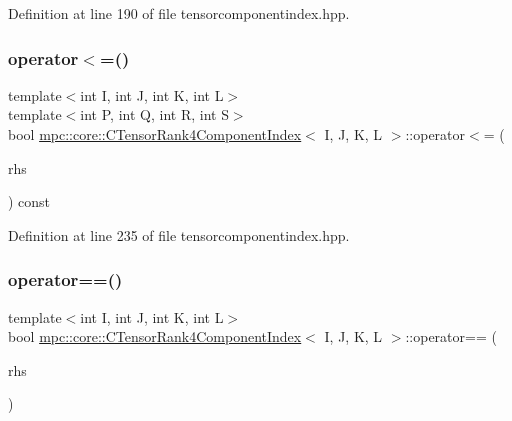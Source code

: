 Definition at line 190 of file tensorcomponentindex.\+hpp.

\mbox{\label{classmpc_1_1core_1_1_c_tensor_rank4_component_index_ab351984f40d8478ff56a79c812c6c06e}} 
\subsubsection{\texorpdfstring{operator$<$=()}{operator<=()}}
{\footnotesize\ttfamily template$<$int I, int J, int K, int L$>$ \\
template$<$int P, int Q, int R, int S$>$ \\
bool \mbox{\hyperlink{classmpc_1_1core_1_1_c_tensor_rank4_component_index}{mpc\+::core\+::\+C\+Tensor\+Rank4\+Component\+Index}}$<$ I, J, K, L $>$\+::operator$<$= (\begin{DoxyParamCaption}\item[{const \mbox{\hyperlink{classmpc_1_1core_1_1_c_tensor_rank4_component_index}{C\+Tensor\+Rank4\+Component\+Index}}$<$ P, Q, R, S $>$ \&}]{rhs }\end{DoxyParamCaption}) const\hspace{0.3cm}{\ttfamily [inline]}}



Definition at line 235 of file tensorcomponentindex.\+hpp.

\mbox{\label{classmpc_1_1core_1_1_c_tensor_rank4_component_index_aa2436baeda315fea3d87243dabd4048c}} 
\subsubsection{\texorpdfstring{operator==()}{operator==()}}
{\footnotesize\ttfamily template$<$int I, int J, int K, int L$>$ \\
bool \mbox{\hyperlink{classmpc_1_1core_1_1_c_tensor_rank4_component_index}{mpc\+::core\+::\+C\+Tensor\+Rank4\+Component\+Index}}$<$ I, J, K, L $>$\+::operator== (\begin{DoxyParamCaption}\item[{const \mbox{\hyperlink{classmpc_1_1core_1_1_c_tensor_rank4_component_index}{C\+Tensor\+Rank4\+Component\+Index}}$<$ I, J, K, L $>$ \&}]{rhs }\end{DoxyParamCaption})\hspace{0.3cm}{\ttfamily [inline]}}



